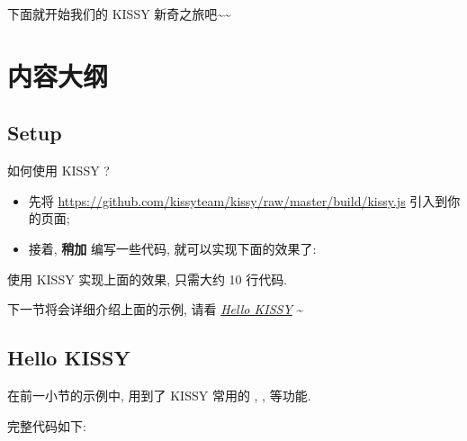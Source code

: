 \documentclass[letterpaper,10pt,english]{sphinxmanual}
\begin{document}
下面就开始我们的 KISSY 新奇之旅吧\textasciitilde{}\textasciitilde{}


\section{内容大纲}
\label{quickstart/index:id3}

\subsection{Setup}
\label{quickstart/setup:setup}\label{quickstart/setup::doc}\label{quickstart/setup:quickstart-setup}
如何使用 KISSY ?
\begin{itemize}
\item {}
先将 \href{https://github.com/kissyteam/kissy/raw/master/build/kissy.js}{https://github.com/kissyteam/kissy/raw/master/build/kissy.js} 引入到你的页面;

\item {}
接着, \textbf{稍加} 编写一些代码, 就可以实现下面的效果了:

\end{itemize}

使用 KISSY 实现上面的效果, 只需大约 10 行代码.

下一节将会详细介绍上面的示例, 请看 {\hyperref[quickstart/hellokissy:quickstart-hellokissy]{\emph{Hello KISSY}}} \textasciitilde{}


\subsection{Hello KISSY}
\label{quickstart/hellokissy:quickstart-hellokissy}\label{quickstart/hellokissy::doc}\label{quickstart/hellokissy:hello-kissy}
在前一小节的示例中, 用到了 KISSY 常用的 , ,  等功能.

完整代码如下:
\end{document}
